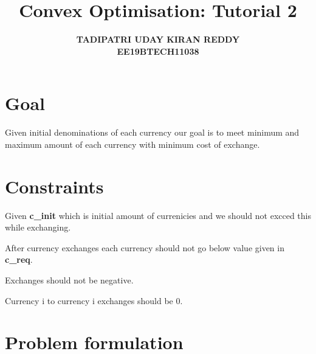 \documentclass{article}
\begin{document}
\title{{\textbf{Convex Optimisation: Tutorial 2}}}
\author{\textbf{TADIPATRI UDAY KIRAN REDDY}\\\textbf{EE19BTECH11038}}
\maketitle

\section*{\hfil Goal}
Given initial denominations of each currency our goal is to meet minimum and maximum amount of each currency with minimum cost of exchange.

\section*{\hfil Constraints}
\begin{list}{•}{}
	\item Given \textbf{c\_init} which is initial amount of currenicies and we should not excced this while exchanging.
	\item After currency exchanges each currency should not go below value given in \textbf{c\_req}.
	\item Exchanges should not be negative.
	\item Currency i to currency i exchanges should be 0.
\end{list}
\section*{\hfil Problem formulation}
\end{document}
